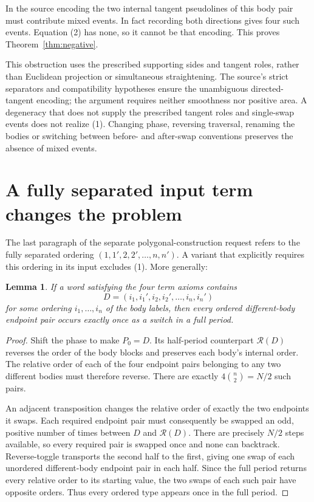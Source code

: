 \documentclass[11pt]{article}
\newtheorem{lemma}[theorem]{Lemma}
\newcommand{\rev}{\mathcal R}
\begin{document}
In the source encoding the two internal tangent pseudolines of this
body pair must contribute mixed events. In fact recording both directions
gives four such events. Equation (2) has none, so it cannot be that
encoding. This proves Theorem~\ref{thm:negative}.

This obstruction uses the prescribed supporting sides and tangent roles,
rather than Euclidean projection or simultaneous straightening. The
source's strict separators and compatibility hypotheses ensure the
unambiguous directed-tangent encoding; the argument requires neither
smoothness nor positive area. A degeneracy that does not supply the
prescribed tangent roles and single-swap events does not realize (1).
Changing phase, reversing traversal, renaming the bodies or switching
between before- and after-swap conventions preserves the absence of
mixed events.

\section{A fully separated input term changes the problem}

The last paragraph of the separate polygonal-construction request
\cite[p.~2551]{OWR} refers to the fully separated ordering
$(1,1',2,2',\ldots,n,n')$. A variant that explicitly requires this
ordering in its input excludes (1). More generally:

\begin{lemma}\label{lem:separated}
If a word satisfying the four term axioms contains
\[
 D=(i_1,i_1',i_2,i_2',\ldots,i_n,i_n')
\]
for some ordering $i_1,\ldots,i_n$ of the body labels, then every
ordered different-body endpoint pair occurs exactly once as a switch
in a full period.
\end{lemma}

\begin{proof}
Shift the phase to make $P_0=D$. Its half-period counterpart
$\rev(D)$ reverses the order of the body blocks and preserves each
body's internal order. The relative order of each of the four endpoint
pairs belonging to any two different bodies must therefore reverse.
There are exactly $4\binom n2=N/2$ such pairs.

An adjacent transposition changes the relative order of exactly the
two endpoints it swaps. Each required endpoint pair must consequently
be swapped an odd, positive number of times between $D$ and $\rev(D)$.
There are precisely $N/2$ steps available, so every required pair is
swapped once and none can backtrack. Reverse-toggle transports the
second half to the first, giving one swap of each unordered
different-body endpoint pair in each half. Since the full period
returns every relative order to its starting value, the two swaps of
each such pair have opposite orders. Thus every ordered type appears
once in the full period.
\end{proof}
\end{document}
